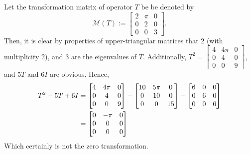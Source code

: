 \begin{enumerate}
        \nl Let the transformation matrix of operator $T$ be be denoted by 
        $$\mathcal M(T) := \begin{bmatrix} 2 & \pi & 0 \\ 0 & 2 & 0 \\ 0 & 0 & 3 \end{bmatrix}.$$
        Then, it is clear by properties of upper-triangular matrices that $2$ (with multiplicity 2), and 3 are the eigenvalues of $T$. Additionally, $T^2 = \displaystyle \begin{bmatrix} 4 & 4\pi & 0 \\ 0 & 4 & 0 \\ 0 & 0 & 9 \end{bmatrix}$, and $5T$ and $6I$ are obvious.
        Hence, 
        \begin{align*}
            T^2 - 5T + 6I &= \begin{bmatrix} 4 & 4\pi & 0 \\ 0 & 4 & 0 \\ 0 & 0 & 9 \end{bmatrix} - \begin{bmatrix} 10 & 5\pi & 0 \\ 0 & 10 & 0 \\ 0 & 0 & 15 \end{bmatrix} + \mqty[\dmat[0]{6}{6}{6}]\\
            &= \begin{bmatrix}
                0 & -\pi & 0\\
                0 & 0 & 0\\
                0 & 0 & 0 
            \end{bmatrix}
        \end{align*}
        Which certainly is not the zero transformation.
    \end{enumerate}
